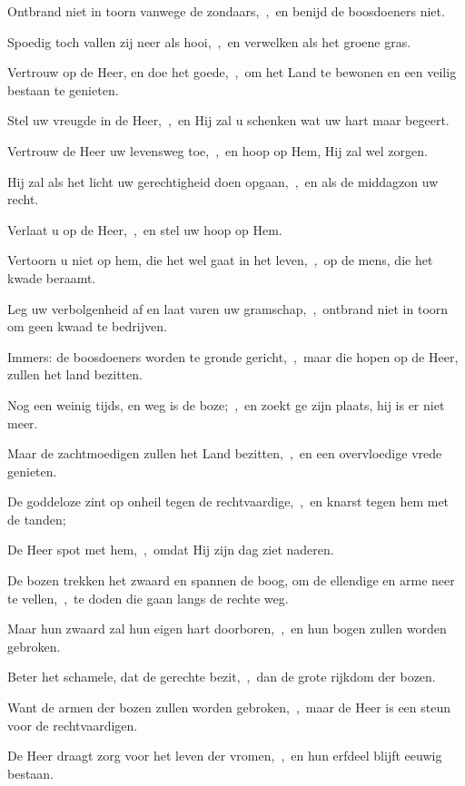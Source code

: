 \documentclass[12pt,twoside,a5paper]{article}
\begin{document}
\begin{halfparskip}
   Ontbrand niet in toorn vanwege de zondaars,~\sep\ en benijd de boosdoeners niet.


  Spoedig toch vallen zij neer als hooi,~\sep\ en verwelken als het groene gras.

  Vertrouw op de Heer, en doe het goede,~\sep\ om het Land te bewonen en een veilig bestaan te genieten.

  Stel uw vreugde in de Heer,~\sep\ en Hij zal u schenken wat uw hart maar begeert.

  Vertrouw de Heer uw levensweg toe,~\sep\ en hoop op Hem, Hij zal wel zorgen.

  Hij zal als het licht uw gerechtigheid doen opgaan,~\sep\ en als de middagzon uw recht.

  Verlaat u op de Heer,~\sep\ en stel uw hoop op Hem.

  Vertoorn u niet op hem, die het wel gaat in het leven,~\sep\ op de mens, die het kwade beraamt.

  Leg uw verbolgenheid af en laat varen uw gramschap,~\sep\ ontbrand niet in toorn om geen kwaad te bedrijven.

  Immers: de boosdoeners worden te gronde gericht,~\sep\ maar die hopen op de Heer, zullen het land bezitten.

  Nog een weinig tijds, en weg is de boze;~\sep\ en zoekt ge zijn plaats, hij is er niet meer.

  Maar de zachtmoedigen zullen het Land bezitten,~\sep\ en een overvloedige vrede genieten.

  De goddeloze zint op onheil tegen de rechtvaardige,~\sep\ en knarst tegen hem met de tanden;

  De Heer spot met hem,~\sep\ omdat Hij zijn dag ziet naderen.

  De bozen trekken het zwaard en spannen de boog, om de ellendige en arme neer te vellen,~\sep\ te doden die gaan langs de rechte weg.

  Maar hun zwaard zal hun eigen hart doorboren,~\sep\ en hun bogen zullen worden gebroken.

  Beter het schamele, dat de gerechte bezit,~\sep\ dan de grote rijkdom der bozen.

  Want de armen der bozen zullen worden gebroken,~\sep\ maar de Heer is een steun voor de rechtvaardigen.

  De Heer draagt zorg voor het leven der vromen,~\sep\ en hun erfdeel blijft eeuwig bestaan.


\end{halfparskip}
\end{document}
